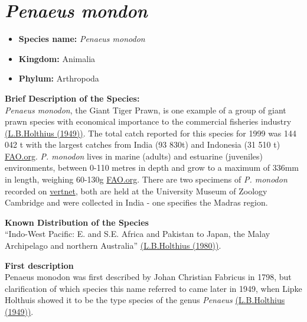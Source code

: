 \documentclass[]{book}
\providecommand{\tightlist}{%
  \setlength{\itemsep}{0pt}\setlength{\parskip}{0pt}}
\theoremstyle{definition}
\theoremstyle{definition}
\theoremstyle{definition}
\theoremstyle{remark}
\begin{document}
\hypertarget{penaeus-mondon}{%
\section{\texorpdfstring{\emph{Penaeus
mondon}}{Penaeus mondon}}\label{penaeus-mondon}}

\begin{itemize}
\tightlist
\item
  \textbf{Species name:} \emph{Penaeus monodon}\\
\item
  \textbf{Kingdom:} Animalia\\
\item
  \textbf{Phylum:} Arthropoda
\end{itemize}

\textbf{Brief Description of the Species:}\\
\emph{Penaeus monodon}, the Giant Tiger Prawn, is one example of a group
of giant prawn species with economical importance to the commercial
fisheries industry
\href{https://decapoda.nhm.org/pdfs/25756/25756.pdf}{(L.B.Holthius
(1949))}. The total catch reported for this species for 1999 was 144 042
t with the largest catches from India (93 830t) and Indonesia (31 510 t)
\href{http://www.fao.org/fishery/species/3405/en}{FAO.org}. \emph{P.
monodon} lives in marine (adults) and estuarine (juveniles)
environments, between 0-110 metres in depth and grow to a maximum of
336mm in length, weighing 60-130g
\href{http://www.fao.org/fishery/species/3405/en}{FAO.org}. There are
two specimens of \emph{P. monodon} recorded on
\href{http://portal.vertnet.org/o/umzc/vertebrates?id=urn-catalog-umzc-vertebrates-i-55155}{vertnet},
both are held at the University Museum of Zoology Cambridge and were
collected in India - one specifies the Madras region.

\textbf{Known Distribution of the Species}\\
``Indo-West Pacific: E. and S.E. Africa and Pakistan to Japan, the Malay
Archipelago and northern Australia''
\href{http://www.fao.org/fishery/species/3405/en}{(L.B.Holthius
(1980))}.

\textbf{First description}\\
Penaeus monodon was first described by Johan Christian Fabricus in 1798,
but clarification of which species this name referred to came later in
1949, when Lipke Holthuis showed it to be the type species of the genus
\emph{Penaeus}
\href{https://decapoda.nhm.org/pdfs/25756/25756.pdf}{(L.B.Holthius
(1949))}.
\end{document}
